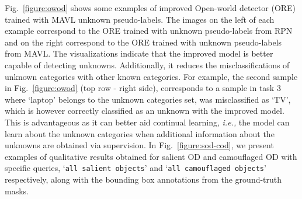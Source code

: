 \documentclass[runningheads]{llncs}
\def\ie{\emph{i.e.,}\xspace} \def\Ie{\emph{I.e.}\xspace}
\newcommand{\txt}[1]{{\texttt{#1}}}
\begin{document}
Fig.~\ref{figure:owod} shows some examples of improved Open-world detector (ORE) trained with MAVL unknown pseudo-labels. The images on the left of each example correspond to the ORE trained with unknown pseudo-labels from RPN and on the right correspond to the ORE trained with unknown pseudo-labels from MAVL. The visualizations indicate that the improved model is better capable of detecting unknowns. Additionally, it reduces the misclassifications of unknown categories with other known categories. For example, the second sample in Fig.~\ref{figure:owod} (top row - right side), corresponds to a sample in task 3 where ‘laptop' belongs to the unknown categories set, was misclassified as ‘TV', which is however correctly classified as an unknown with the improved model. This is advantageous as it can better aid continual learning, \ie the model can learn about the unknown categories when additional information about the unknowns are obtained via supervision. In Fig.~\ref{figure:sod-cod}, we present examples of qualitative results obtained for salient OD and camouflaged OD with specific queries, ‘\txt{all salient objects}'  and ‘\txt{all camouflaged objects}' respectively, along with the bounding box annotations from the ground-truth masks.
\end{document}
